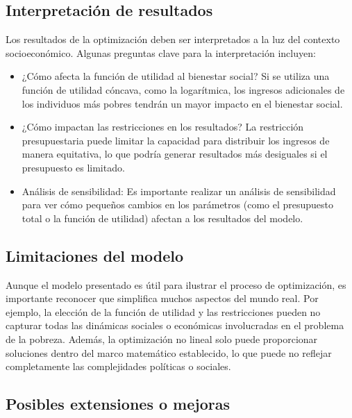 \subsection{Interpretación de resultados}

\begin{flushleft}
	Los resultados de la optimización deben ser interpretados a la luz del contexto socioeconómico. Algunas preguntas clave para la interpretación incluyen:
\end{flushleft}

\begin{itemize}
	\item ¿Cómo afecta la función de utilidad al bienestar social? Si se utiliza una función de utilidad cóncava, como la logarítmica, los ingresos adicionales de los individuos más pobres tendrán un mayor impacto en el bienestar social.
	\item ¿Cómo impactan las restricciones en los resultados? La restricción presupuestaria puede limitar la capacidad para distribuir los ingresos de manera equitativa, lo que podría generar resultados más desiguales si el presupuesto es limitado.
	\item Análisis de sensibilidad: Es importante realizar un análisis de sensibilidad para ver cómo pequeños cambios en los parámetros (como el presupuesto total o la función de utilidad) afectan a los resultados del modelo.
\end{itemize}

\subsection{Limitaciones del modelo}

\begin{flushleft}
	Aunque el modelo presentado es útil para ilustrar el proceso de optimización, es importante reconocer que simplifica muchos aspectos del mundo real. Por ejemplo, la elección de la función de utilidad y las restricciones pueden no capturar todas las dinámicas sociales o económicas involucradas en el problema de la pobreza. Además, la optimización no lineal solo puede proporcionar soluciones dentro del marco matemático establecido, lo que puede no reflejar completamente las complejidades políticas o sociales.
\end{flushleft}

\subsection{Posibles extensiones o mejoras}

